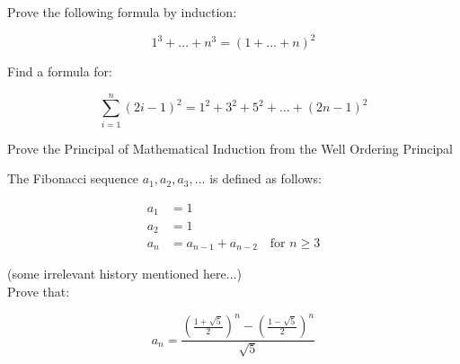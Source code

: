 \documentclass[12pt,letterpaper]{hmcpset}
\begin{document}

\begin{problem}[2.1.ii]
    Prove the following formula by induction:

    \[1^3+...+n^3 = \left( 1+...+n \right)^2\]
\end{problem}

\begin{solution}

\end{solution}

\begin{problem}[2.2.ii]
    Find a formula for:

    \[\sum_{i=1}^n \left( 2i-1 \right)^2 = 1^2 + 3^2 + 5^2 + ... + \left( 2n-1 \right)^2\]
\end{problem}

\begin{solution}

\end{solution}

\begin{problem}[2.10]
   Prove the Principal of Mathematical Induction from the Well Ordering Principal 
\end{problem}

\begin{solution}

\end{solution}

\begin{problem}[2.20]
    The Fibonacci sequence \(a_1,a_2,a_3,...\) is defined as follows:

    \begin{align*}
        a_1 &= 1\\
        a_2 &= 1\\
        a_n &= a_{n-1} + a_{n-2} \quad \text{for } n \ge 3
    \end{align*}

    (some irrelevant history mentioned here...)\\

    Prove that:

    \[ a_n = \frac{\left(\frac{1+\sqrt{5}}{2}\right)^n - \left(\frac{1-\sqrt{5}}{2}\right)^n}{\sqrt{5}} \]
\end{problem}

\begin{solution}

\end{solution}
\end{document}

